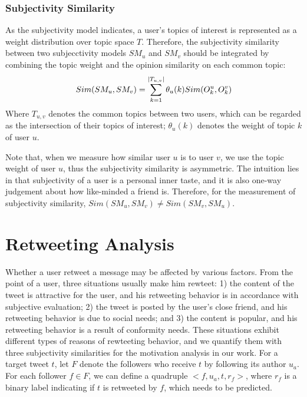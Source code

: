 \documentclass[letterpaper]{article}
\begin{document}
\subsubsection{Subjectivity Similarity}

As the subjectivity model indicates, a user's topics of interest is represented as a weight distribution over topic space $ T $. Therefore, the subjectivity similarity between two subjecctivity models $SM_u$ and $SM_v$ should be integrated by combining the topic weight and the opinion similarity on each common topic:
\begin{equation}
\label{subsim}
Sim(SM_{u},SM_{v})=\sum_{k=1}^{|T_{u,v}|}\theta_{u}(k)\* Sim(O_{k}^{u},O_{k}^{v})
\end{equation}
Where $ T_{u,v} $ denotes the common topics between two users, which can be regarded as the intersection of their topics of interest; $ \theta_{u}(k) $ denotes the weight of topic $ k $ of user $ u $.

Note that, when we measure how similar user $ u $ is to user $ v $, we use the topic weight of user $ u $, thus the subjectivity similarity is asymmetric. The intuition lies in that subjectivity of a user is a personal inner taste, and it is also one-way judgement about how like-minded a friend is. Therefore, for the measurement of subjectivity similarity, $ Sim(SM_u,SM_v)\neq Sim(SM_v,SM_u)$.

\section{Retweeting Analysis}
\label{retweet}

Whether a user retweet a message may be affected by various factors. 
From the point of a user, three situations usually make him rewteet: 1) the content of the tweet is attractive for the user, and his retweeting behavior is in accordance with subjective evaluation; 2) the tweet is posted by the user's close friend, and his retweeting behavior is due to social needs; and 3) the content is popular, and his retweeting behavior is a result of conformity needs\cite{cialdini2004social}. These situations exhibit different types of reasons of rewteeting behavior, and we quantify them with three subjectivity similarities for the motivation analysis in our work. 
For a target tweet $ t $, let $ F $ denote the followers who receive $ t $ by following its author $ u_{a} $. 
For each follower $ f \in F $, we can define a quadruple $ <f, u_{a}, t, r_{f}>  $, where $ r_{f} $ is a binary label indicating if $ t $ is retweeted by $ f $, which needs to be predicted.
\end{document}

